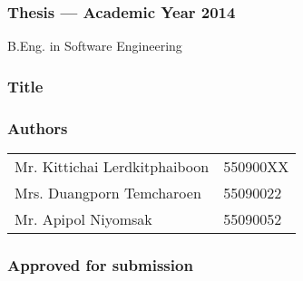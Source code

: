 \thispagestyle{empty}

\begin{flushleft}
\subsubsection{\Large{Thesis --- Academic Year 2014}}
B.Eng. in Software Engineering \kmitl

\vspace{2cm}

\subsubsection{\Large{Title}}
\dms

\vspace{1cm}
\subsubsection{\Large{Authors}}
\begin{tabular}{ll}
Mr. Kittichai Lerdkitphaiboon & 550900XX \\
Mrs. Duangporn Temcharoen & 55090022 \\
Mr. Apipol Niyomsak & 55090052
\end{tabular}
\end{flushleft}

\vfill

\begin{flushright}
\subsubsection{\Large{Approved for submission}}
\vspace{1cm}
\vspace{1cm}
 \\
\vspace{1cm}
 \\
\end{flushright}